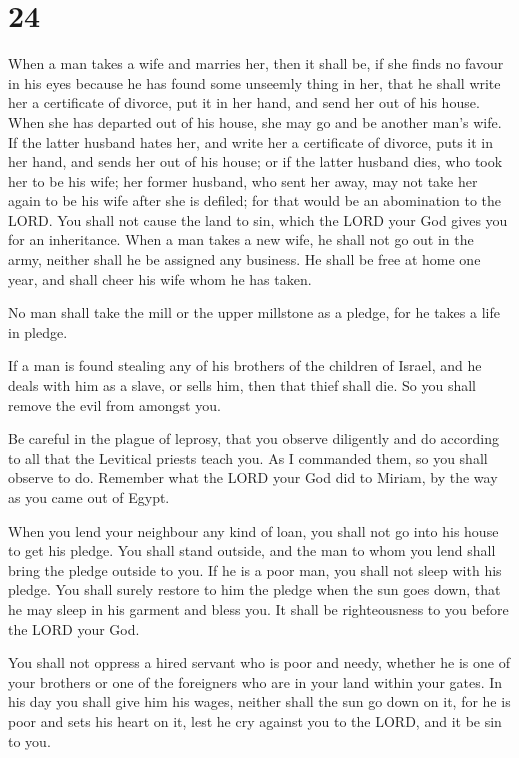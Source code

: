 \hypertarget{section-23}{%
\section{24}\label{section-23}}

 When a man takes a wife and marries her, then it shall
be, if she finds no favour in his eyes because he has found some
unseemly thing in her, that he shall write her a certificate of divorce,
put it in her hand, and send her out of his house.  When
she has departed out of his house, she may go and be another man's wife.
 If the latter husband hates her, and write her a
certificate of divorce, puts it in her hand, and sends her out of his
house; or if the latter husband dies, who took her to be his wife;
 her former husband, who sent her away, may not take her
again to be his wife after she is defiled; for that would be an
abomination to the LORD. You shall not cause the land to sin, which the
LORD your God gives you for an inheritance.  When a man
takes a new wife, he shall not go out in the army, neither shall he be
assigned any business. He shall be free at home one year, and shall
cheer his wife whom he has taken.

 No man shall take the mill or the upper millstone as a
pledge, for he takes a life in pledge.

 If a man is found stealing any of his brothers of the
children of Israel, and he deals with him as a slave, or sells him, then
that thief shall die. So you shall remove the evil from amongst you.

 Be careful in the plague of leprosy, that you observe
diligently and do according to all that the Levitical priests teach you.
As I commanded them, so you shall observe to do.  Remember
what the LORD your God did to Miriam, by the way as you came out of
Egypt.

 When you lend your neighbour any kind of loan, you shall
not go into his house to get his pledge.  You shall stand
outside, and the man to whom you lend shall bring the pledge outside to
you.  If he is a poor man, you shall not sleep with his
pledge.  You shall surely restore to him the pledge when
the sun goes down, that he may sleep in his garment and bless you. It
shall be righteousness to you before the LORD your God.

 You shall not oppress a hired servant who is poor and
needy, whether he is one of your brothers or one of the foreigners who
are in your land within your gates.  In his day you shall
give him his wages, neither shall the sun go down on it, for he is poor
and sets his heart on it, lest he cry against you to the LORD, and it be
sin to you.

